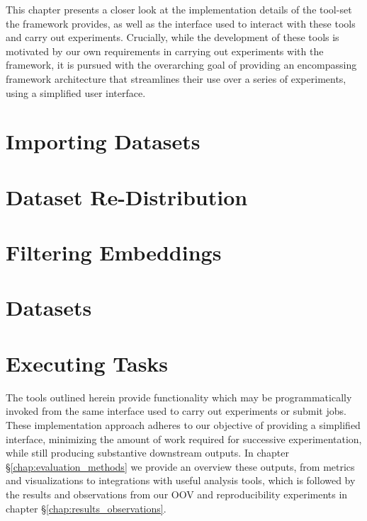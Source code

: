 \documentclass[../../fyp.tex]{subfiles}
\begin{document}
 
This chapter presents a closer look at the implementation details of the tool-set the framework provides, as well as the interface used to interact with these tools and carry out experiments. Crucially, while the development of these tools is motivated by our own requirements in carrying out experiments with the framework, it is pursued with the overarching goal of providing an encompassing framework architecture that streamlines their use over a series of experiments, using a simplified user interface. 

\section{Importing Datasets} \label{sec:importing_datasets}


\section{Dataset Re-Distribution} \label{sec:dataset_redist}


\section{Filtering Embeddings} \label{sec:filtering_embeddings}


\section{Datasets}


\section{Executing Tasks} \label{sec:executing_tasks}


The tools outlined herein provide functionality which may be programmatically invoked from the same interface used to carry out experiments or submit jobs. These implementation approach adheres to our objective of providing a simplified interface, minimizing the amount of work required for successive experimentation, while still producing substantive downstream outputs. In chapter \S\ref{chap:evaluation_methods} we provide an overview these outputs, from metrics and visualizations to integrations with useful analysis tools, which is followed by the results and observations from our OOV and reproducibility experiments in chapter \S\ref{chap:results_observations}.
\end{document}
